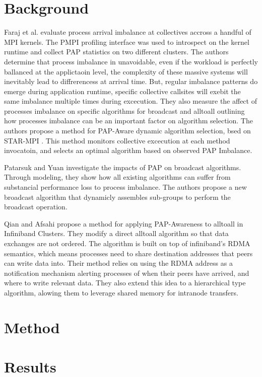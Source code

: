 \section{Background}

Faraj et al. \cite{Faraj2008StudyProcArrivalMPIColl} evaluate process arrival imbalance at collectives accross a handful of MPI kernels.
The PMPI profiling interface was used to introspect on the kernel runtime and collect PAP statistics on two different clusters.
The authors determine that process imbalance in unavoidable, even if the workload is perfectly ballanced at the applictaoin level, the complexity of these massive systems will inevitably lead to diffrerencess at arrival time. 
But, regular imbalance patterns do emerge during application runtime, specific collective callsites will exebit the same imbalance multiple times during excecution.
They also measure the affect of processes imbalance on specific algorithms for broadcast and alltoall outlining how processes imbalance can be an important factor on algorithm selection.
The authors propose a method for PAP-Aware dynamic algorithm selection, bsed on STAR-MPI \cite{Faraj2006StarMPI}.
This method monitors collective excecution at each method invocatoin, and selects an optimal algorithm based on observed PAP Imbalance. 

Patarsuk and Yuan \cite{Patarasuk2008EffBcastDifProcArr} investigate the impacts of PAP on broadcast algorithms.
Through modeling, they show how all existing algorithms can suffer from substancial performance loss to process imbalance. 
The authors propose a new broadcast algorithm that dynamicly assembles sub-groups to perform the broadcast operation.

Qian and Afsahi \cite{Qian2009ProcArrivalSHMA2AIB} propose a method for applying PAP-Awareness to alltoall in Infiniband Clusters.
They modify a direct alltoall algorithm so that data exchanges are not ordered.
The algorithm is built on top of infiniband's RDMA semantics, which means processes need to share destination addresses that peers can write data into. 
Their method relies on using the RDMA address as a notification mechanism alerting processes of when their peers have arrived, and where to write relevant data.
They also extend this idea to a hierarchical type algorithm, alowing them to leverage shared memory for intranode transfers.



\section{Method}


\section{Results}

